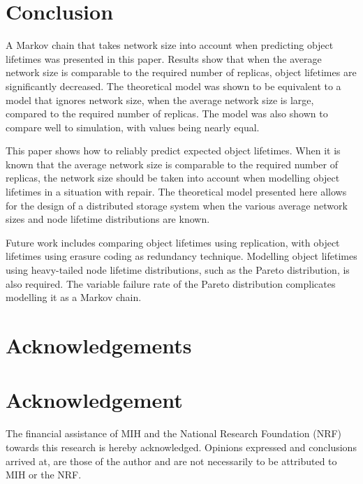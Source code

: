 \documentclass[10pt,a4paper,conference]{IEEEtran}
\begin{document}
\section{Conclusion}
\label{conclusion}

A Markov chain that takes network size into account when predicting object lifetimes was presented in this paper. Results show that when the average network size is comparable to the required number of replicas, object lifetimes are significantly decreased. The theoretical model was shown to be equivalent to a model that ignores network size, when the average network size is large, compared to the required number of replicas. The model was also shown to compare well to simulation, with values being nearly equal.

This paper shows how to reliably predict expected object lifetimes. When it is known that the average network size is comparable to the required number of replicas, the network size should be taken into account when modelling object lifetimes in a situation with repair. The theoretical model presented here allows for the design of a distributed storage system when the various average network sizes and node lifetime distributions are known.

Future work includes comparing object lifetimes using replication, with object lifetimes using erasure coding as redundancy technique. Modelling object lifetimes using heavy-tailed node lifetime distributions, such as the Pareto distribution, is also required. The variable failure rate of the Pareto distribution complicates modelling it as a Markov chain.

\ifCLASSOPTIONcompsoc
  \section*{Acknowledgements}
\else
  \section*{Acknowledgement}
\fi

The financial assistance of MIH and the National Research Foundation (NRF) towards this research is hereby acknowledged. Opinions expressed and
conclusions arrived at, are those of the author and are not necessarily to be attributed to MIH or the NRF.




\end{document}
